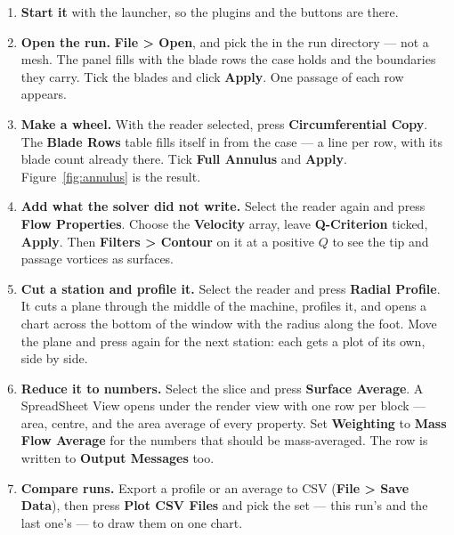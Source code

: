 \documentclass[11pt,a4paper]{article}
\newcommand{\prop}[1]{\textbf{#1}}          %
\newcommand{\menu}[1]{\textbf{#1}}          %
\begin{document}
\begin{enumerate}[leftmargin=8mm,itemsep=3pt]
  \item \textbf{Start it} with the launcher, so the plugins and the buttons are
    there.

  \item \textbf{Open the run.} \menu{File > Open}, and pick the
     in the run directory --- not a mesh. The panel fills with
    the blade rows the case holds and the boundaries they carry. Tick the
    blades and click \menu{Apply}. One passage of each row appears.

  \item \textbf{Make a wheel.} With the reader selected, press
    \menu{Circumferential Copy}. The \prop{Blade Rows} table fills itself in
    from the case --- a line per row, with its blade count already there. Tick
    \prop{Full Annulus} and \menu{Apply}. Figure~\ref{fig:annulus} is the
    result.

  \item \textbf{Add what the solver did not write.} Select the reader again and
    press \menu{Flow Properties}. Choose the \prop{Velocity} array, leave
    \prop{Q-Criterion} ticked, \menu{Apply}. Then \menu{Filters > Contour} on
    it at a positive $Q$ to see the tip and passage vortices as surfaces.

  \item \textbf{Cut a station and profile it.} Select the reader and press
    \menu{Radial Profile}. It cuts a plane through the middle of the machine,
    profiles it, and opens a chart across the bottom of the window with the
    radius along the foot. Move the plane and press again for the next station:
    each gets a plot of its own, side by side.

  \item \textbf{Reduce it to numbers.} Select the slice and press \menu{Surface
    Average}. A SpreadSheet View opens under the render view with one row per
    block --- area, centre, and the area average of every property. Set
    \prop{Weighting} to \menu{Mass Flow Average} for the numbers that should be
    mass-averaged. The row is written to \menu{Output Messages} too.

  \item \textbf{Compare runs.} Export a profile or an average to CSV
    (\menu{File > Save Data}), then press \menu{Plot CSV Files} and pick the set
    --- this run's and the last one's --- to draw them on one chart.
\end{enumerate}
\end{document}
